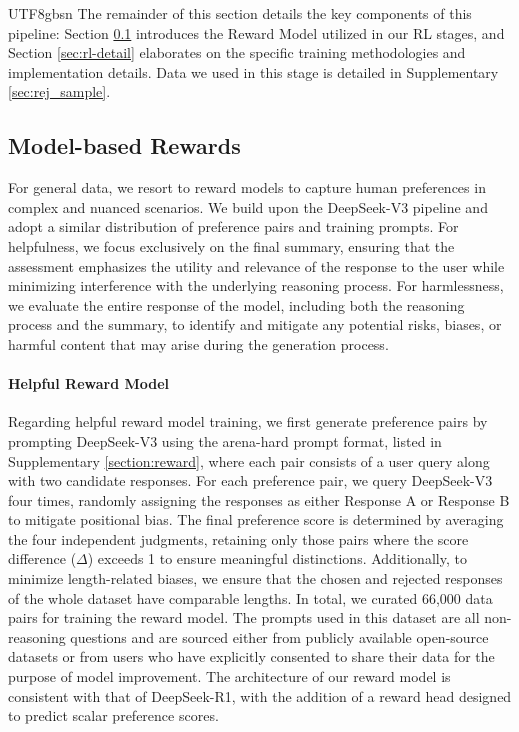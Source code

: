 \documentclass[11pt, a4paper, logo, copyright, nonumbering]{deepseek}
\begin{document}
\begin{CJK*}{UTF8}{gbsn}
The remainder of this section details the key components of this pipeline: Section \ref{sec: model_reward} introduces the Reward Model utilized in our RL stages, and Section \ref{sec:rl-detail} elaborates on the specific training methodologies and implementation details. Data we used in this stage is detailed in Supplementary \ref{sec:rej_sample}.

\subsection{Model-based Rewards}\label{sec: model_reward}

For general data, we resort to reward models to capture human preferences in complex and nuanced scenarios. We build
upon the DeepSeek-V3 pipeline and adopt a similar distribution of preference pairs and training prompts. For helpfulness, we focus exclusively on the final summary, ensuring that the
assessment emphasizes the utility and relevance of the response to the user while minimizing
interference with the underlying reasoning process. For harmlessness, we evaluate the entire
response of the model, including both the reasoning process and the summary, to identify and
mitigate any potential risks, biases, or harmful content that may arise during the generation
process.

\paragraph{Helpful Reward Model}


Regarding helpful reward model training, we first generate preference pairs by prompting DeepSeek-V3 using the arena-hard prompt format, listed in Supplementary \ref{section:reward}, where each pair consists of a user query along with two candidate responses. For each preference pair, we query DeepSeek-V3 four times, randomly assigning the responses as either Response A or Response B to mitigate positional bias. The final preference score is determined by averaging the four independent judgments, retaining only those pairs where the score difference ($\Delta$) exceeds 1 to ensure meaningful distinctions. Additionally, to minimize length-related biases, we ensure that the chosen and rejected responses of the whole dataset have comparable lengths. In total, we curated 66,000 data pairs for training the reward model. The prompts used in this dataset are all non-reasoning questions and are sourced either from publicly available open-source datasets or from users who have explicitly consented to share their data for the purpose of model improvement. The architecture of our reward model is consistent with that of DeepSeek-R1, with the addition of a reward head designed to predict scalar preference scores. 


\end{CJK*}
\end{document}
